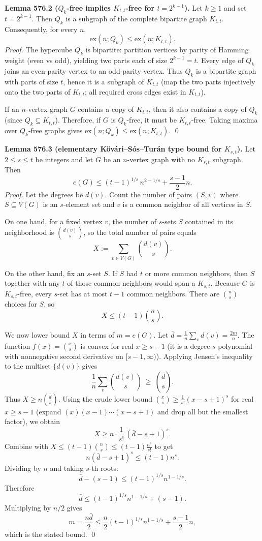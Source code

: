 \medskip
\textbf{Lemma 576.2 ($Q_k$-free implies $K_{t,t}$-free for $t=2^{k-1}$).}
Let $k\ge 1$ and set $t=2^{k-1}$.
Then $Q_k$ is a subgraph of the complete bipartite graph $K_{t,t}$. Consequently, for every $n$,
\[
\mathrm{ex}(n;Q_k)\le \mathrm{ex}(n;K_{t,t}).
\]
\emph{Proof.}
The hypercube $Q_k$ is bipartite: partition vertices by parity of Hamming weight (even vs odd), yielding two parts each of size $2^{k-1}=t$.
Every edge of $Q_k$ joins an even-parity vertex to an odd-parity vertex.
Thus $Q_k$ is a bipartite graph with parts of size $t$, hence it is a subgraph of $K_{t,t}$ (map the two parts injectively onto the two parts of $K_{t,t}$; all required cross edges exist in $K_{t,t}$).

If an $n$-vertex graph $G$ contains a copy of $K_{t,t}$, then it also contains a copy of $Q_k$ (since $Q_k\subseteq K_{t,t}$).
Therefore, if $G$ is $Q_k$-free, it must be $K_{t,t}$-free.
Taking maxima over $Q_k$-free graphs gives
$\mathrm{ex}(n;Q_k)\le \mathrm{ex}(n;K_{t,t})$.
\qed

\medskip
\textbf{Lemma 576.3 (elementary K\"ov\'ari--S\'os--Tur\'an type bound for $K_{s,t}$).}
Let $2\le s\le t$ be integers and let $G$ be an $n$-vertex graph with no $K_{s,t}$ subgraph.
Then
\[
 e(G) \le (t-1)^{1/s}\, n^{2-1/s} + \frac{s-1}{2}n.
\]
\emph{Proof.}
Let the degrees be $d(v)$.
Count the number of pairs $(S,v)$ where $S\subseteq V(G)$ is an $s$-element set and $v$ is a common neighbor of all vertices in $S$.

On one hand, for a fixed vertex $v$, the number of $s$-sets $S$ contained in its neighborhood is $\binom{d(v)}{s}$, so the total number of pairs equals
\[ X:=\sum_{v\in V(G)}\binom{d(v)}{s}. \]

On the other hand, fix an $s$-set $S$. If $S$ had $t$ or more common neighbors, then $S$ together with any $t$ of those common neighbors would span a $K_{s,t}$.
Because $G$ is $K_{s,t}$-free, every $s$-set has at most $t-1$ common neighbors.
There are $\binom{n}{s}$ choices for $S$, so
\[ X\le (t-1)\binom{n}{s}. \]

We now lower bound $X$ in terms of $m=e(G)$.
Let $\bar d=\frac{1}{n}\sum_v d(v)=\frac{2m}{n}$.
The function $f(x)=\binom{x}{s}$ is convex for real $x\ge s-1$ (it is a degree-$s$ polynomial with nonnegative second derivative on $[s-1,\infty)$).
Applying Jensen's inequality to the multiset $\{d(v)\}$ gives
\[
\frac{1}{n}\sum_v \binom{d(v)}{s}\ \ge\ \binom{\bar d}{s}.
\]
Thus $X\ge n\binom{\bar d}{s}$.
Using the crude lower bound $\binom{x}{s}\ge \frac{1}{s!}(x-s+1)^s$ for real $x\ge s-1$ (expand $(x)(x-1)\cdots(x-s+1)$ and drop all but the smallest factor), we obtain
\[
X\ge n\cdot \frac{1}{s!}\,(\bar d-s+1)^s.
\]
Combine with $X\le (t-1)\binom{n}{s}\le (t-1)\frac{n^s}{s!}$ to get
\[
 n(\bar d-s+1)^s \le (t-1)n^s.
\]
Dividing by $n$ and taking $s$-th roots:
\[
\bar d - (s-1) \le (t-1)^{1/s} n^{1-1/s}.
\]
Therefore
\[
\bar d\le (t-1)^{1/s} n^{1-1/s} + (s-1).
\]
Multiplying by $n/2$ gives
\[
 m=\frac{n\bar d}{2} \le \frac{n}{2}(t-1)^{1/s} n^{1-1/s} + \frac{s-1}{2}n,
\]
which is the stated bound.
\qed


